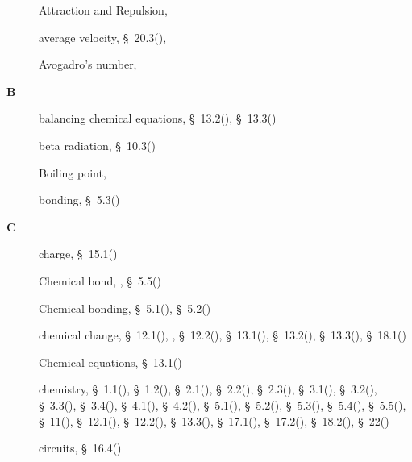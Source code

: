 \begin{multicols}{2}
{\begin{description}
	  \item[] \noindent\raggedright Attraction and Repulsion,  \pageref{id2471643}
	  \item[] \noindent\raggedright average velocity,  \S~20.3(\pageref{m38791}),  \pageref{id2528820}
	  \item[] \noindent\raggedright Avogadro's number,  \pageref{id2496617}
	  \vspace{.3cm}
	  \item[{\large \bfseries B}]\noindent\raggedright
	  balancing chemical equations,  \S~13.2(\pageref{m38726}),  \S~13.3(\pageref{m38727})
	  \item[] \noindent\raggedright beta radiation,  \S~10.3(\pageref{m38779})
	  \item[] \noindent\raggedright Boiling point,  \pageref{id2412302}
	  \item[] \noindent\raggedright bonding,  \S~5.3(\pageref{m38684})
	  \vspace{.3cm}
	  \item[{\large \bfseries C}]\noindent\raggedright
	  charge,  \S~15.1(\pageref{m38780})
	  \item[] \noindent\raggedright Chemical bond,  \pageref{id2427062},  \S~5.5(\pageref{m38689})
	  \item[] \noindent\raggedright Chemical bonding,  \S~5.1(\pageref{m38704}),  \S~5.2(\pageref{m38701})
	  \item[] \noindent\raggedright chemical change,  \S~12.1(\pageref{m38709}),  \pageref{id2458579},  \S~12.2(\pageref{m38711}),  \S~13.1(\pageref{m38721}),  \S~13.2(\pageref{m38726}),  \S~13.3(\pageref{m38727}),  \S~18.1(\pageref{m38717})
	  \item[] \noindent\raggedright Chemical equations,  \S~13.1(\pageref{m38721})
	  \item[] \noindent\raggedright chemistry,  \S~1.1(\pageref{m38708}),  \S~1.2(\pageref{m38706}),  \S~2.1(\pageref{m38736}),  \S~2.2(\pageref{m38734}),  \S~2.3(\pageref{m38730}),  \S~3.1(\pageref{m38756}),  \S~3.2(\pageref{m38745}),  \S~3.3(\pageref{m38753}),  \S~3.4(\pageref{m38741}),  \S~4.1(\pageref{m38760}),  \S~4.2(\pageref{m38757}),  \S~5.1(\pageref{m38704}),  \S~5.2(\pageref{m38701}),  \S~5.3(\pageref{m38684}),  \S~5.4(\pageref{m38694}),  \S~5.5(\pageref{m38689}),  \S~11(\pageref{m38120}),  \S~12.1(\pageref{m38709}),  \S~12.2(\pageref{m38711}),  \S~13.3(\pageref{m38727}),  \S~17.1(\pageref{m38720}),  \S~17.2(\pageref{m38719}),  \S~18.2(\pageref{m38712}),  \S~22(\pageref{m38138})
	  \item[] \noindent\raggedright circuits,  \S~16.4(\pageref{m38776})

\end{description}}
\end{multicols}
